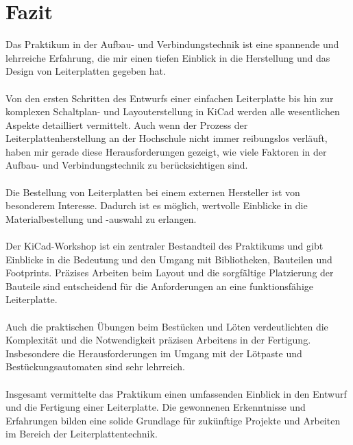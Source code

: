 
\section{Fazit}
Das Praktikum in der Aufbau- und Verbindungstechnik ist eine spannende und lehrreiche Erfahrung, die mir einen tiefen Einblick in die Herstellung und das Design von Leiterplatten gegeben hat.
\\
\\
Von den ersten Schritten des Entwurfs einer einfachen Leiterplatte bis hin zur komplexen Schaltplan- und Layouterstellung in KiCad werden alle wesentlichen Aspekte detailliert vermittelt.
Auch wenn der Prozess der Leiterplattenherstellung an der Hochschule nicht immer reibungslos verläuft, haben mir gerade diese Herausforderungen gezeigt, wie viele Faktoren in der Aufbau- und Verbindungstechnik zu berücksichtigen sind.
\\
\\
Die Bestellung von Leiterplatten bei einem externen Hersteller ist von besonderem Interesse.
Dadurch ist es möglich, wertvolle Einblicke in die Materialbestellung und -auswahl zu erlangen.
\\
\\
Der KiCad-Workshop ist ein zentraler Bestandteil des Praktikums und gibt Einblicke in die Bedeutung und den Umgang mit Bibliotheken, Bauteilen und Footprints.
Präzises Arbeiten beim Layout und die sorgfältige Platzierung der Bauteile sind entscheidend für die Anforderungen an eine funktionsfähige Leiterplatte. 
\\
\\
Auch die praktischen Übungen beim Bestücken und Löten verdeutlichten die Komplexität und die Notwendigkeit präzisen Arbeitens in der Fertigung.
Insbesondere die Herausforderungen im Umgang mit der Lötpaste und Bestückungsautomaten sind sehr lehrreich.
\\
\\
Insgesamt vermittelte das Praktikum einen umfassenden Einblick in den Entwurf und die Fertigung einer Leiterplatte. Die gewonnenen Erkenntnisse und Erfahrungen bilden eine solide Grundlage für zukünftige Projekte und Arbeiten im Bereich der Leiterplattentechnik.
